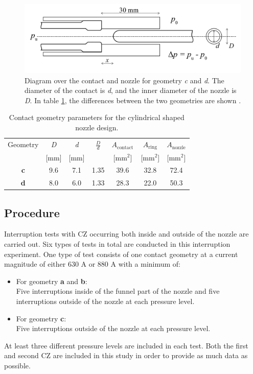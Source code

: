 \documentclass[10pt,b5paper,twoside]{article}
\begin{document}
\begin{figure} [H]
\centering
\includegraphics[scale=0.3]{Bilder/Method/contactSetUp.png}
\caption{Diagram over the contact and nozzle for geometry \textit{c} and \textit{d}. The diameter of the contact is \textit{d}, and the inner diameter of the nozzle is \textit{D}. In table \ref{tab:contGeoParaC}, the differences between the two geometries are shown \cite{bib:AFIMVLBA}.} \label{fig:contactAndNozzleC}
\end{figure}

\begin{table}[H]
\center
\caption{Contact geometry parameters for the cylindrical shaped nozzle design.}
 \begin{tabular}{|c|c|c|c|c|c|c|}
\hline 
Geometry & \textit{D} & \textit{d}  & $\frac{D}{d}$ &  $A_\mathrm{{contact}}$ & $A_\mathrm{{ring}}$  & $A_\mathrm{{nozzle}}$ \\
  & [mm] &  [mm] &   &  [mm$^2$] &  [mm$^2$] &   [mm$^2$] \\
\hline 
\textbf{c} & 9.6 & 7.1 & 1.35 & 39.6 & 32.8 & 72.4 \\ 
\hline
\textbf{d} & 8.0 & 6.0 & 1.33 & 28.3 & 22.0 & 50.3 \\ 
\hline
\end{tabular} 
\label{tab:contGeoParaC}
\end{table}

\subsection{Procedure} \label{sec:procedure}
Interruption tests with CZ occurring both inside and outside of the nozzle are carried out. Six types of tests in total are conducted in this interruption experiment. One type of test consists of one contact geometry at a current magnitude of either 630 A or 880 A with a minimum of:
\begin{itemize}
\item For geometry \textbf{a} and \textbf{b}: \\
Five interruptions inside of the funnel part of the nozzle and five interruptions outside of the nozzle at each pressure level.

\item For geometry \textbf{c}: \\
Five interruptions outside of the nozzle at each pressure level.

\end{itemize}
At least three different pressure levels are included in each test. Both the first and second CZ are included in this study in order to provide as much data as possible.
\end{document}

